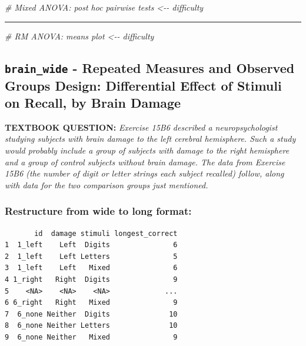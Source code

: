 \documentclass[
]{article}
\newenvironment{Shaded}{\begin{snugshade}}{\end{snugshade}}
\newcommand{\CommentTok}[1]{\textcolor[rgb]{0.56,0.35,0.01}{\textit{#1}}}
\begin{document}
\clearpage

\begin{Shaded}
\begin{Highlighting}[]
\CommentTok{\# Mixed ANOVA: post hoc pairwise tests \textless{}{-}{-} difficulty}
\end{Highlighting}
\end{Shaded}

\begin{center}\rule{0.5\linewidth}{0.5pt}\end{center}

\begin{Shaded}
\begin{Highlighting}[]
\CommentTok{\# RM ANOVA: means plot \textless{}{-}{-} difficulty}
\end{Highlighting}
\end{Shaded}

\clearpage

\hypertarget{brain_wide---repeated-measures-and-observed-groups-design-differential-effect-of-stimuli-on-recall-by-brain-damage}{%
\subsection{\texorpdfstring{\texttt{brain\_wide} - Repeated Measures and
Observed Groups Design: Differential Effect of Stimuli on Recall, by
Brain
Damage}{brain\_wide - Repeated Measures and Observed Groups Design: Differential Effect of Stimuli on Recall, by Brain Damage}}\label{brain_wide---repeated-measures-and-observed-groups-design-differential-effect-of-stimuli-on-recall-by-brain-damage}}

\textbf{TEXTBOOK QUESTION:} \emph{Exercise 15B6 described a
neuropsychologist studying subjects with brain damage to the left
cerebral hemisphere. Such a study would probably include a group of
subjects with damage to the right hemisphere and a group of control
subjects without brain damage. The data from Exercise 15B6 (the number
of digit or letter strings each subject recalled) follow, along with
data for the two comparison groups just mentioned.}

\hypertarget{restructure-from-wide-to-long-format-2}{%
\subsubsection{Restructure from wide to long
format:}\label{restructure-from-wide-to-long-format-2}}

\begin{verbatim}
       id  damage stimuli longest_correct
1  1_left    Left  Digits               6
2  1_left    Left Letters               5
3  1_left    Left   Mixed               6
4 1_right   Right  Digits               9
5    <NA>    <NA>    <NA>             ...
6 6_right   Right   Mixed               9
7  6_none Neither  Digits              10
8  6_none Neither Letters              10
9  6_none Neither   Mixed               9
\end{verbatim}
\end{document}
